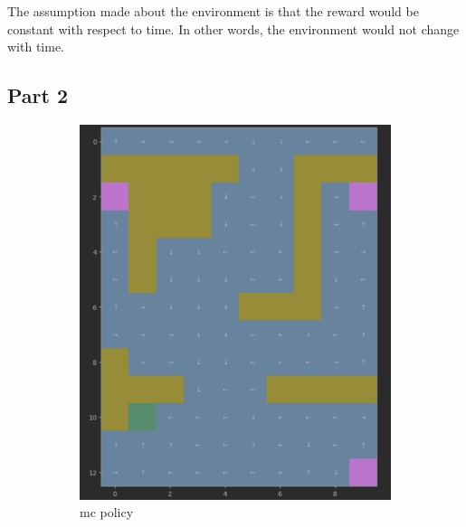 \documentclass{article}
\begin{document}
    The assumption made about the environment is that the reward would be constant with respect to time.
    In other words, the environment would not change with time.

    \subsection{Part 2}
    \begin{figure}[h]
        \begin{subfigure} {0.5\textwidth}
            \includegraphics[width=0.9\linewidth]{images/mc_policy}
            \caption{mc policy}\label{fig:mc_policy}
        \end{subfigure}
        \begin{subfigure} {0.5\textwidth}

\end{subfigure}
\end{figure}
\end{document}
